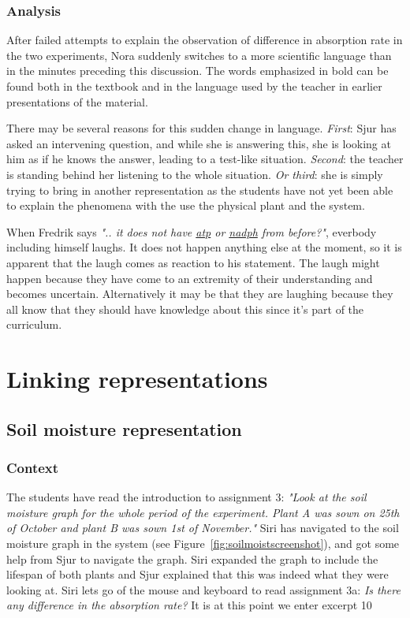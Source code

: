\subsubsection*{Analysis}
After failed attempts to explain the observation of difference in absorption rate in the two experiments, Nora suddenly switches to a more scientific language than in the minutes preceding this discussion. The words emphasized in bold can be found both in the textbook and in the language used by the teacher in earlier presentations of the material.

There may be several reasons for this sudden change in language. \emph{First}: Sjur has asked an intervening question, and while she is answering this, she is looking at him as if he knows the answer, leading to a test-like situation. \emph{Second}: the teacher is standing behind her listening to the whole situation. \emph{Or third}: she is simply trying to bring in another representation as the students have not yet been able to explain the phenomena with the use the physical plant and the system. 

When Fredrik says \emph{".. it does not have \underline{atp} or \underline{nadph} from before?"}, everbody including himself laughs. It does not happen anything else at the moment, so it is apparent that the laugh comes as reaction to his statement. The laugh might happen because they have come to an extremity of their understanding and becomes uncertain. Alternatively it may be that they are laughing because they all know that they should have knowledge about this since it's part of the curriculum.


\section{Linking representations}
\label{cha:linking}
\subsection{Soil moisture representation}


\subsubsection*{Context}
The students have read the introduction to assignment 3: \emph{"Look at the soil moisture graph for the whole period of the experiment. Plant A was sown on 25th of October and plant B was sown 1st of November."} Siri has navigated to the soil moisture graph in the system (see Figure~\ref{fig:soilmoistscreenshot}), and got some help from Sjur to navigate the graph. Siri expanded the graph to include the lifespan of both plants and Sjur explained that this was indeed what they were looking at. Siri lets go of the mouse and keyboard to read assignment 3a: \emph{Is there any difference in the absorption rate?} It is at this point we enter excerpt 10



